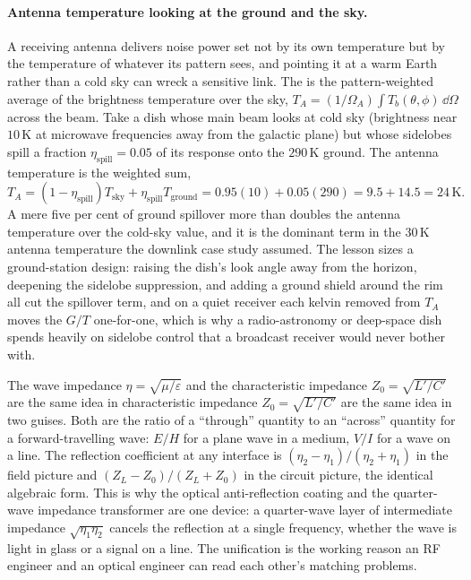 \paragraph{Antenna temperature looking at the ground and the sky.}
A receiving antenna delivers noise power set not by its own temperature but
by the temperature of whatever its pattern sees, and pointing it at a warm
Earth rather than a cold sky can wreck a sensitive link. The
 is the pattern-weighted average of the
brightness temperature over the sky, $T_A = (1/\Omega_A)\int T_b(\theta,
\phi)\,\dd\Omega$ across the beam. Take a dish whose main beam looks at
cold sky (brightness near $10\,\si{\kelvin}$ at microwave frequencies away
from the galactic plane) but whose sidelobes spill a fraction $\eta_{\text{spill}}
= 0.05$ of its response onto the $290\,\si{\kelvin}$ ground. The antenna
temperature is the weighted sum,
\[
T_A = (1 - \eta_{\text{spill}})T_{\text{sky}} + \eta_{\text{spill}}
T_{\text{ground}} = 0.95(10) + 0.05(290) = 9.5 + 14.5 = 24\,\si{\kelvin}.
\]
A mere five per cent of ground spillover more than doubles the antenna
temperature over the cold-sky value, and it is the dominant term in the
$30\,\si{\kelvin}$ antenna temperature the downlink case study assumed. The
lesson sizes a ground-station design: raising the dish's look angle away
from the horizon, deepening the sidelobe suppression, and adding a ground
shield around the rim all cut the spillover term, and on a quiet receiver
each kelvin removed from $T_A$ moves the $G/T$ one-for-one, which is why a
radio-astronomy or deep-space dish spends heavily on sidelobe control that
a broadcast receiver would never bother with.

\begin{mastery}
The wave impedance $\eta = \sqrt{\mu/\varepsilon}$ and the
characteristic impedance $Z_{0} = \sqrt{L'/C'}$ are the same idea in
characteristic impedance $Z_{0} = \sqrt{L'/C'}$ are the same idea in
two guises. Both are the ratio of a ``through'' quantity to an
``across'' quantity for a forward-travelling wave: $E/H$ for a plane
wave in a medium, $V/I$ for a wave on a line. The reflection
coefficient at any interface is $(\eta_{2}-\eta_{1})/(\eta_{2}+
\eta_{1})$ in the field picture and $(Z_{L}-Z_{0})/(Z_{L}+Z_{0})$ in
the circuit picture, the identical algebraic form. This is why the
optical anti-reflection coating and the quarter-wave impedance
transformer are one device: a quarter-wave layer of intermediate
impedance $\sqrt{\eta_{1}\eta_{2}}$ cancels the reflection at a single
frequency, whether the wave is light in glass or a signal on a line.
The unification is the working reason an RF engineer and an optical
engineer can read each other's matching problems.
\end{mastery}

